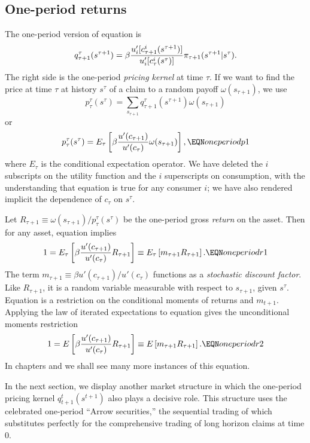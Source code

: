 \subsection{One-period returns}
The one-period version of equation  is
$$q^\tau_{\tau+1}(s^{\tau +1}) = \beta {u'_i[c_{\tau+1}^i(s^{\tau+1})]
               \over u'_i[c_\tau^i(s^\tau)] } \pi_{\tau+1}(s^{\tau+1} \vert s^\tau). $$
The right side is the one-period {\it pricing kernel} at time $\tau$.
If we want to  find the  price  at time $\tau$ at history $s^\tau$
of a claim to a random payoff $\omega(s_{\tau+1})$, we use
$$ p^\tau_{\tau}(s^\tau) = \sum_{s_{\tau+1}} q^\tau_{\tau+1}(s^{\tau+1})
      \omega(s_{\tau+1}) $$
or
$$ p^\tau_{\tau}(s^\tau) = E_\tau \left[\beta {u'(c_{\tau+1}) \over u'(c_{\tau})}
       \omega(s_{\tau +1}) \right], \EQN oneperiodp1 $$
where $E_\tau$ is the conditional expectation operator.
We have deleted the $i$ subscripts on the utility function
and the $i$ superscripts on consumption, with the
understanding that equation  is true for any consumer $i$;
we have also rendered implicit the  dependence of $c_{\tau}$ on $s^\tau$.


Let $R_{\tau+1} \equiv \omega(s_{\tau+1}) /p^\tau_{\tau}(s^\tau) $
 be the one-period gross {\it return} on the asset.
Then for any asset, equation  implies
$$ 1 = E_\tau \left[\beta{u'(c_{\tau+1}) \over u'(c_\tau)} R_{\tau+1} \right]
     \equiv E_\tau \left[ m_{\tau+1} R_{\tau+1} \right]  .
    \EQN oneperiodr1 $$
The term $m_{\tau+1} \equiv \beta u'(c_{\tau+1}) / u'(c_\tau)$
functions as a {\it stochastic discount factor}.    Like
$R_{\tau+1}$, it is a random %
variable  measurable with respect to $s_{\tau+1}$, given
$s^{\tau}$.
    Equation  is a restriction on
the conditional moments of returns and $m_{t+1}$.  Applying
the law of iterated expectations to equation  gives
the unconditional moments restriction
$$ 1 = E \left[\beta{u'(c_{\tau+1}) \over u'(c_\tau)} R_{\tau+1} \right]
     \equiv E \left[ m_{\tau+1} R_{\tau+1} \right]  .
    \EQN oneperiodr2 $$
In chapters  and  we shall see many more instances of this
equation.


In the next section, we display  another market structure in which
  the one-period pricing kernel $q^t_{t+1}(s^{t+1})$    also plays
a decisive role.  This structure uses the
celebrated one-period ``Arrow  securities,'' the sequential
trading of which  substitutes perfectly for the comprehensive trading
of long horizon claims at  time $0$.

